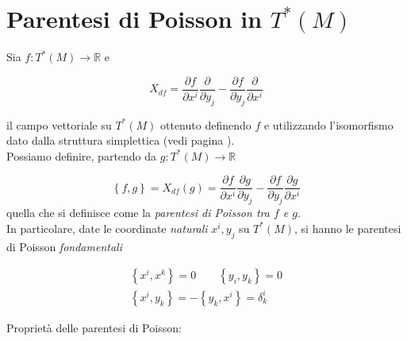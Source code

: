 \section{Parentesi di Poisson in $T^* (M)$}
\setcounter{equation}{0}

Sia $ f : T^* (M) \rightarrow \mathbb{R} $ e

\begin{equation}
X_{df} = \frac{\partial f}{\partial x^i} \frac{\partial}{\partial y_j} -\frac{\partial f}{\partial y_j} \frac{\partial}{\partial x^i}
\end{equation}

il campo vettoriale su $ T^* (M) $ ottenuto definendo $ f $ e utilizzando l'isomorfismo dato dalla struttura simplettica (vedi pagina \pageref{pag:7_fibr_cot}). \\

Possiamo definire, partendo da $ g : T^* (M) \rightarrow \mathbb{R} $

\begin{equation}
\left\lbrace f, g \right\rbrace = X_{df} (g) = \frac{\partial f}{\partial x^i} \frac{\partial g}{\partial y_j} - \frac{\partial f}{\partial y_j} \frac{\partial g}{\partial x^i}
\end{equation}
quella che si definisce come la \textit{parentesi di Poisson tra $ f $ e $ g $}. \\
In particolare, date le coordinate \textit{naturali} $ x^i, y_j $ su $ T^* (M) $, si hanno le parentesi di Poisson \textit{fondamentali}

\begin{equation}
\begin{split}
\left\lbrace x^i, x^k \right\rbrace = 0 \qquad \left\lbrace y_i, y_k \right\rbrace = 0 \\
\left\lbrace x^i, y_k \right\rbrace = - \left\lbrace y_k, x^i \right\rbrace = \delta^i _k
\end{split}
\end{equation}

Proprietà delle parentesi di Poisson:

